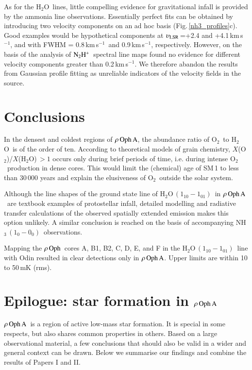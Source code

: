 \documentclass{aa}
\newcommand{\kms}{km\,s$^{-1}$}       %
\newcommand{\vlsr}{$\upsilon_{\rm LSR}$}        %
\newcommand{\water}{H$_{2}$O}
\newcommand{\etttio}{{\rm H}$_2$O$\,(1_{10} - 1_{01})$}
\newcommand{\molo}{O$_{2}$}                     %
\newcommand{\ettnoll}{{\rm NH}$_3\,(1_0 - 0_0)$}
\newcommand{\ntwohp}{${\rm N_2H^+}$}
\newcommand{\ro}{$\rho \, {\rm Oph}$}
\newcommand{\roa}{$\rho \, {\rm Oph \, A}$}
\begin{document}
As for the \water\ lines, little compelling evidence for gravitational infall is provided by the ammonia line observations. Essentially perfect fits can be obtained by introducing two velocity components on an  ad hoc basis (Fig.\,\ref{nh3_profiles}c). Good examples would be hypothetical components at \vlsr\,=+2.4 and +4.1\,\kms, and with FWHM = 0.8\,\kms\ and 0.9\,\kms, respectively. However, on the basis of the analysis of \ntwohp\ spectral line maps \citet{liseau2015} found no evidence for different velocity components greater than 0.2\,\kms. We therefore abandon the results from Gaussian profile fitting as unreliable indicators of the velocity fields in the source.

\section{Conclusions}

In the densest and coldest regions of \roa, the abundance ratio of \molo\ to \water\ is of the order of ten. According to theoretical models of grain chemistry, $X$(\molo)/$X$(\water)$\,>1$ occurs only during brief periods of time, i.e. during intense \molo\ production in dense cores. This would limit the (chemical) age of SM\,1 to less than 30\,000 years and explain the elusiveness of \molo\ outside the solar system.

Although the line shapes of the ground state line of \etttio\ in \roa\ are textbook examples of protostellar infall, detailed modelling and radiative transfer calculations of the observed spatially extended emission makes this option unlikely. A similar conclusion is reached on the basis of accompanying \ettnoll\ observations.

Mapping the \ro\ cores A, B1, B2, C, D, E, and F in the \etttio\ line with Odin resulted in clear detections only in \roa. Upper limits are within 10 to 50\,mK (rms). 


\section{Epilogue: star formation in \roa}

\roa\ is a region of active low-mass star formation. It is special in some respects, but also shares  common properties in others. Based on a large observational material, a few conclusions that should also be valid  in a wider and general context can be drawn. Below we  summarise our findings and  combine the results of Papers I and II. 
\end{document}
